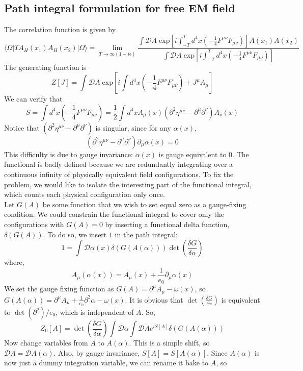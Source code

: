 \subsection{Path integral formulation for free EM field}
\noindent
The correlation function is given by
\[\langle \Omega | T A_H(x_1) A_H(x_2)| \Omega \rangle = \lim_{T \to \infty(1-i\epsilon)} \frac{\int \mathcal{D}A \; \mathrm{exp} \left[ i\int_{-T}^T d^4x (-\frac{1}{4} F^{\mu\nu}F_{\mu\nu}) \right] A(x_1) A(x_2)}{\int \mathcal{D}A \; \mathrm{exp} \left[ i\int_{-T}^T d^4x (-\frac{1}{4} F^{\mu\nu}F_{\mu\nu}) \right]}\]
The generating function is 
\[Z[J] = \int \mathcal{D}A \; \mathrm{exp} \left[ i\int d^4x (-\frac{1}{4} F^{\mu\nu}F_{\mu\nu}) + J^{\mu} A_{\mu} \right]\]
We can verify that
\[S = \int d^4x (-\frac{1}{4} F^{\mu\nu}F_{\mu\nu}) = \frac{1}{2} \int d^4x A_{\mu}(x) (\partial^2\eta^{\mu\nu} - \partial^{\mu}\partial^{\nu})A_{\nu}(x)\]
Notice that $(\partial^2\eta^{\mu\nu} - \partial^{\mu}\partial^{\nu})$ is singular, since for any $\alpha(x)$, 
\[(\partial^2\eta^{\mu\nu} - \partial^{\mu}\partial^{\nu})\partial_{\mu}\alpha(x) = 0\]
This difficulty is due to gauge invariance: $\alpha(x)$ is gauge equivalent to $0$. The functional is badly defined because we are redundantly integrating over a continuous infinity of physically equivalent field configurations. To fix the problem, we would like to isolate the interesting part of the functional integral, which counts each physical configuration only once. \\
Let $G(A)$ be some function that we wish to set equal zero as a gauge-fixing condition. We could constrain the functional integral to cover only the configurations with $G(A) = 0$ by inserting a functional delta function, $\delta(G(A))$. To do so, we insert $1$ in the path integral:
\[ 1 = \int \mathcal{D}\alpha(x) \delta(G(A(\alpha))) \det \left( \frac{\delta G}{\delta \alpha} \right)\]
where,
\[A_{\mu}(\alpha(x)) = A_{\mu}(x) + \frac{1}{e_0}\partial_{\mu}\alpha(x)\]
We set the gauge fixing function as $G(A) = \partial^{\mu} A_{\mu} -\omega(x)$, so $G(A(\alpha)) = \partial^{\mu} A_{\mu} + \frac{1}{e_0}\partial^2 \alpha - \omega(x)$. It is obvious that $\det \left( \frac{\delta G}{\delta \alpha} \right)$ is equivalent to $\det(\partial^2)/e_0$, which is independent of $A$. So,
\[Z_0[A] = \det \left( \frac{\delta G}{\delta \alpha} \right) \int \mathcal{D}\alpha \int \mathcal{D}A e^{iS[A]} \delta(G(A(\alpha)))\]
Now change variables from $A$ to $A(\alpha)$. This is a simple shift, so $\mathcal{D}A = \mathcal{D}A(\alpha)$. Also, by gauge invariance, $S[A] = S[A(\alpha)]$. Since $A(\alpha)$ is now just a dummy integration variable, we can rename it bake to $A$, so
